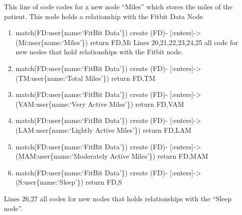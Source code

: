 \documentclass[]{book}
\providecommand{\tightlist}{%
  \setlength{\itemsep}{0pt}\setlength{\parskip}{0pt}}
\begin{document}
This line of code codes for a new node ``Miles'' which stores the miles
of the patient. This node holds a relationship with the Fitbit Data Node

\begin{enumerate}
\def\labelenumi{\arabic{enumi}.}
\setcounter{enumi}{19}
\tightlist
\item
  match(FD:user\{name:`FitBit Data'\}) create (FD)-
  {[}:enters{]}-\textgreater{} (Mi:user\{name:`Miles'\}) return FD,Mi
  Lines 20,21,22,23,24,25 all code for new nodes that hold relationships
  with the Fitbit node.
\item
  match(FD:user\{name:`FitBit Data'\}) create (FD)-
  {[}:enters{]}-\textgreater{} (TM:user\{name:`Total Miles'\}) return
  FD,TM
\item
  match(FD:user\{name:`FitBit Data'\}) create (FD)-
  {[}:enters{]}-\textgreater{} (VAM:user\{name:`Very Active Miles'\})
  return FD,VAM
\item
  match(FD:user\{name:`FitBit Data'\}) create (FD)-
  {[}:enters{]}-\textgreater{} (LAM:user\{name:`Lightly Active Miles'\})
  return FD,LAM
\item
  match(FD:user\{name:`FitBit Data'\}) create (FD)-
  {[}:enters{]}-\textgreater{} (MAM:user\{name:`Moderately Active
  Miles'\}) return FD,MAM
\item
  match(FD:user\{name:`FitBit Data'\}) create (FD)-
  {[}:enters{]}-\textgreater{} (S:user\{name:`Sleep'\}) return FD,S
\end{enumerate}

Lines 26,27 all codes for new nodes that holds relationships with the
``Sleep node''.
\end{document}

